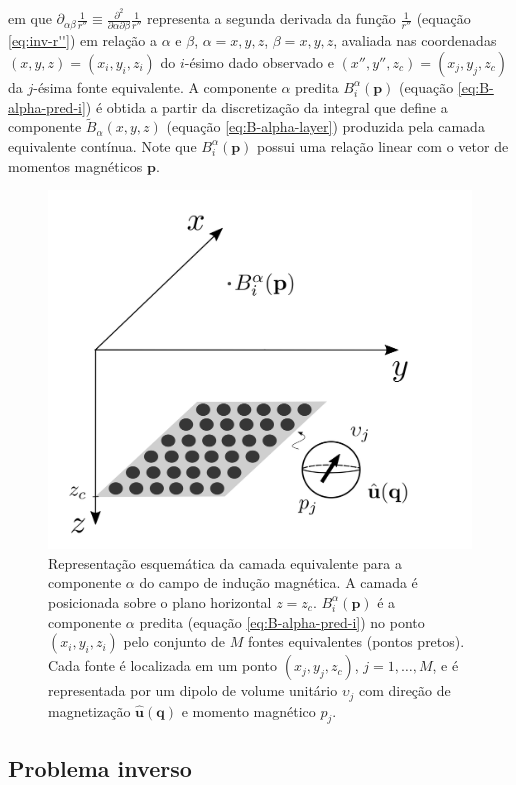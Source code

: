 em que $\partial_{\alpha\beta} \frac{1}{r''} \equiv \frac{\partial^{2}}{\partial \alpha \partial \beta} \frac{1}{r''}$ 
representa a segunda derivada da função $\frac{1}{r''}$ (equação \ref{eq:inv-r''}) em relação a $\alpha$ e $\beta$, 
$\alpha = x, y, z$, $\beta = x, y, z$, avaliada nas coordenadas $(x, y, z) = (x_{i}, y_{i}, z_{i})$ do $i$-ésimo dado  
observado e $(x'', y'', z_{c}) = (x_{j}, y_{j}, z_{c})$ da $j$-ésima fonte equivalente.
A componente $\alpha$ predita $B^{\alpha}_{i} (\mathbf{p})$ (equação \ref{eq:B-alpha-pred-i}) é 
obtida a partir da discretização da integral que define a componente $\tilde{B}_{\alpha}(x, y, z)$
(equação \ref{eq:B-alpha-layer}) produzida pela camada equivalente contínua.
Note que $B^{\alpha}_{i}(\mathbf{p})$ possui uma relação linear com o vetor de momentos 
magnéticos $\mathbf{p}$.

\begin{figure}[H]
	\centering
	\includegraphics[width=.7\textwidth]{Fig/mag_vec/eqlayer_figure_balpha.png}
	\caption{Representação esquemática da camada equivalente para a componente $\alpha$ do campo de 
	indução magnética. A camada é posicionada sobre o plano horizontal $z = z_{c}$. 
	$B^{\alpha}_{i}(\mathbf{p})$ é a componente $\alpha$ predita (equação \ref{eq:B-alpha-pred-i}) no 
	ponto $(x_{i},y_{i},z_{i})$ pelo conjunto de $M$ fontes equivalentes (pontos pretos). 
	Cada fonte é localizada em um ponto  $(x_{j},y_{j},z_{c})$, 
	$j = 1,\dots, M$, e é representada por um dipolo de volume unitário $\upsilon_{j}$ 
	com direção de magnetização $\hat{\mathbf{u}}(\mathbf{q})$ e momento magnético $p_{j}$.}
	\label{fig:eqlayer_balpha_sketch}
\end{figure}

\subsection{Problema inverso}
\label{subsec:balpha_prob_inv}

